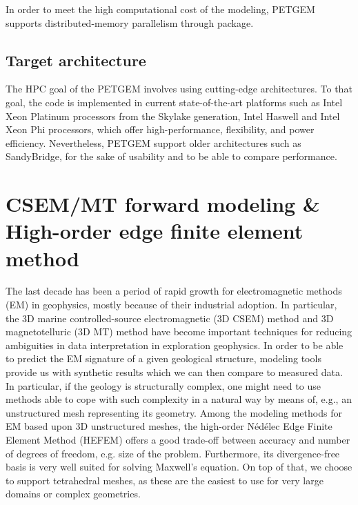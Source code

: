 \documentclass[letterpaper,10pt,english]{sphinxmanual}
\begin{document}
In order to meet the high computational cost of the modeling, PETGEM supports
distributed-memory parallelism through  package.


\section{Target architecture}
\label{\detokenize{Features:target-architecture}}\label{\detokenize{Features:id8}}
The HPC goal of the PETGEM involves using cutting-edge architectures.
To that goal, the code is implemented in current state-of-the-art
platforms such as Intel Xeon Platinum processors from the Skylake generation,
Intel Haswell and Intel Xeon Phi processors, which offer
high-performance, flexibility, and power efficiency. Nevertheless,
PETGEM support older architectures such as SandyBridge, for the sake
of usability and to be able to compare performance.


\chapter{CSEM/MT forward modeling \& High-order edge finite element method}
\label{\detokenize{Mathbackground:csem-mt-forward-modeling-high-order-edge-finite-element-method}}\label{\detokenize{Mathbackground:math-background}}\label{\detokenize{Mathbackground::doc}}
The last decade has been a period of rapid growth for electromagnetic
methods (EM) in geophysics, mostly because of their industrial adoption.
In particular, the 3D marine controlled-source electromagnetic (3D CSEM) method
and 3D magnetotelluric (3D MT) method have become important techniques for
reducing ambiguities in data interpretation in exploration geophysics.
In order to be able to predict the EM signature of a given geological structure,
modeling tools provide us with synthetic results which we can then compare to
measured data. In particular, if the geology is structurally complex, one might
need to use methods able to cope with such complexity in a natural way by means of, e.g., an
unstructured mesh representing its geometry. Among the modeling methods
for EM based upon 3D unstructured meshes, the high-order Nédélec Edge Finite Element
Method (HEFEM) offers a good trade-off between accuracy and number of degrees
of freedom, e.g. size of the problem. Furthermore, its divergence-free basis
is very well suited for solving Maxwell’s equation. On top of that, we choose
to support tetrahedral meshes, as these are the easiest to use for very large
domains or complex geometries.
\end{document}

